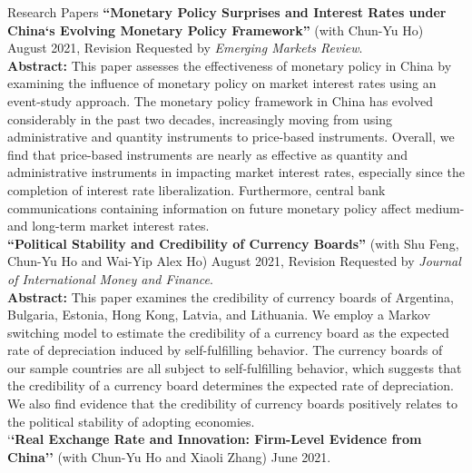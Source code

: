 \documentclass{resume_liang} %
\begin{document}
\begin{rSection}{Research Papers}
\textbf{``Monetary Policy Surprises and Interest Rates under China‘s Evolving Monetary Policy Framework''} (with Chun-Yu Ho) August 2021, Revision Requested by \textit{Emerging Markets Review}.\vspace{0.1cm}\\ 
\textbf{Abstract:} This paper assesses the effectiveness of monetary policy in China by examining the influence of monetary policy on market interest rates using an event-study approach. The monetary policy framework in China has evolved considerably in the past two decades, increasingly moving from using administrative and quantity instruments to price-based instruments. Overall, we find that price-based instruments are nearly as effective as quantity and administrative instruments in impacting market interest rates, especially since the completion of interest rate liberalization. Furthermore, central bank communications containing information on future monetary policy affect medium- and long-term market interest rates.\vspace{0.2cm}\\
\textbf{``Political Stability and Credibility of Currency Boards''} (with Shu Feng, Chun-Yu Ho and Wai-Yip Alex Ho) August 2021, Revision Requested by \textit{Journal of International Money and Finance}.\vspace{0.1cm}\\
\textbf{Abstract:} This paper examines the credibility of currency boards of Argentina, Bulgaria, Estonia, Hong Kong, Latvia, and Lithuania. We employ a Markov switching model to estimate the credibility of a currency board as the expected rate of depreciation induced by self-fulfilling behavior. The currency boards of our sample countries are all subject to self-fulfilling behavior, which suggests that the credibility of a currency board determines the expected rate of depreciation. We also find evidence that the credibility of currency boards positively relates to the political stability of adopting economies.\vspace{0.1cm}\\
`\textbf{`Real Exchange Rate and Innovation: Firm-Level Evidence from China''} (with Chun-Yu Ho and Xiaoli Zhang) June 2021.\vspace{0.1cm}\\

\end{rSection}
\end{document}
